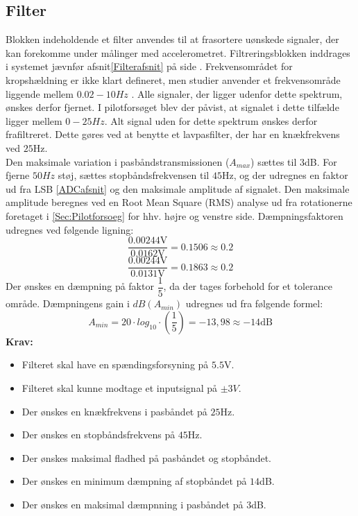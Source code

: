 \subsection{Filter}\label{FilterAfs}
Blokken indeholdende et filter anvendes til at frasortere uønskede signaler, der kan forekomme under målinger med accelerometret. Filtreringsblokken inddrages i systemet jævnfør afsnit\ref{Filterafsnit} på side \pageref{Filterafsnit}. Frekvensområdet for kropshældning er ikke klart defineret, men studier anvender et frekvensområde liggende mellem $0.02-10Hz$ \cite{Martinez-Mendez2011}. Alle signaler, der ligger udenfor dette spektrum, ønskes derfor fjernet. I pilotforsøget blev der påvist, at signalet i dette tilfælde ligger mellem $0-25Hz$. Alt signal uden for dette spektrum ønskes derfor frafiltreret. Dette gøres ved at benytte et lavpasfilter, der har en knækfrekvens ved $25$Hz. \\
Den maksimale variation i pasbåndstransmissionen ($A_{max}$) sættes til $3$dB. For fjerne $50Hz$ støj, sættes stopbåndsfrekvensen til $45$Hz, og der udregnes en faktor ud fra LSB \ref{ADCafsnit} og den maksimale amplitude af signalet. Den maksimale amplitude beregnes ved en Root Mean Square (RMS) analyse ud fra rotationerne foretaget i \ref{Sec:Pilotforsoeg} for hhv. højre og venstre side. Dæmpningsfaktoren udregnes ved følgende ligning:
\begin{equation}
\dfrac{0.00244\text{V}}{0.0162\text{V}} = 0.1506 \approx 0.2 
\end{equation}
\begin{equation}
\dfrac{0.00244\text{V}}{0.0131\text{V}} = 0.1863  \approx 0.2
\end{equation}
Der ønskes en dæmpning på faktor $\dfrac{1}{5}$, da der tages forbehold for et tolerance område. Dæmpningens gain i $dB(A_{min})$ udregnes ud fra følgende formel:   
\begin{equation}
A_{min}=20 \cdot log_{10} \cdot (\frac{1}{5}) = -13,98 \approx -14\text{dB}
\end{equation}
\textbf{Krav:}
\begin{itemize}
	\item Filteret skal have en spændingsforsyning på $5.5$V.
	\item Filteret skal kunne modtage et inputsignal på $\pm3V$.
	\item Der ønskes en knækfrekvens i pasbåndet på $25$Hz.
	\item Der ønskes en stopbåndsfrekvens på $45$Hz.
	\item Der ønskes maksimal fladhed på pasbåndet og stopbåndet.
	\item Der ønskes en minimum dæmpning af stopbåndet på $14$dB.
	\item Der ønskes en maksimal dæmpnning i pasbåndet på $3$dB.
\end{itemize}
